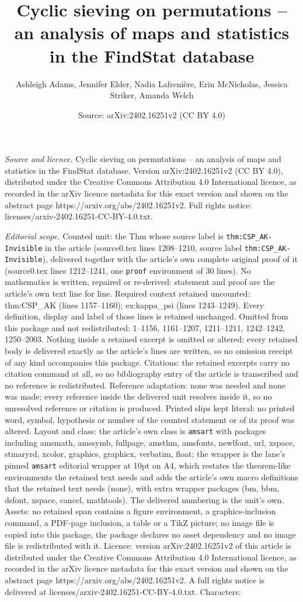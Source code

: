 \documentclass[10pt,a4paper]{amsart}
\title[Cyclic sieving on permutations -- an analysis of maps and st]{Cyclic sieving on permutations -- an analysis of maps and statistics in the FindStat database}
\author{Ashleigh Adams, Jennifer Elder, Nadia Lafreni\`ere, Erin McNicholas, Jessica Striker, Amanda Welch}
\date{Source: arXiv:2402.16251v2 (CC BY 4.0)}
\begin{document}
\maketitle

\noindent\emph{Source and licence.} Cyclic sieving on permutations -- an analysis of maps and statistics in the FindStat database. Version arXiv:2402.16251v2 (CC BY 4.0), distributed under the Creative Commons Attribution 4.0 International licence, as recorded in the arXiv licence metadata for this exact version and shown on the abstract page https://arxiv.org/abs/2402.16251v2. Full rights notice: licenses/arxiv-2402.16251-CC-BY-4.0.txt.\par\smallskip

\noindent\textit{Editorial scope.} Counted unit: the Thm whose source label is \texttt{thm:CSP\_AK-Invisible} in the article (source0.tex lines 1208--1210, source label \texttt{thm:CSP\_AK-Invisible}), delivered together with the article's own complete original proof of it (source0.tex lines 1212--1241, one \texttt{proof} environment of 30 lines). No mathematics is written, repaired or re-derived: statement and proof are the article's own text line for line. Required context retained uncounted: thm:CSP\_AK (lines 1157--1160); ex:kappa\_psi (lines 1243--1249). Every definition, display and label of those lines is retained unchanged. Omitted from this package and not redistributed: 1--1156, 1161--1207, 1211--1211, 1242--1242, 1250--2003. Nothing inside a retained excerpt is omitted or altered: every retained body is delivered exactly as the article's lines are written, so no omission receipt of any kind accompanies this package. Citations: the retained excerpts carry no citation command at all, so no bibliography entry of the article is transcribed and no reference is redistributed. Reference adaptation: none was needed and none was made; every reference inside the delivered unit resolves inside it, so no unresolved reference or citation is produced. Printed slips kept literal: no printed word, symbol, hypothesis or number of the counted statement or of its proof was altered. Layout and class: the article's own class is \texttt{amsart} with packages including amsmath, amssymb, fullpage, amsthm, amsfonts, newlfont, url, xspace, stmaryrd, xcolor, graphics, graphicx, verbatim, float; the wrapper is the lane's pinned \texttt{amsart} editorial wrapper at 10pt on A4, which restates the theorem-like environments the retained text needs and adds the article's own macro definitions that the retained text needs (none), with extra wrapper packages (bm, bbm, dsfont, xspace, cancel, mathtools). The delivered numbering is the unit's own. Assets: no retained span contains a figure environment, a graphics-inclusion command, a PDF-page inclusion, a table or a TikZ picture; no image file is copied into this package, the package declares no asset dependency and no image file is redistributed with it. Licence: version arXiv:2402.16251v2 of this article is distributed under the Creative Commons Attribution 4.0 International licence, as recorded in the arXiv licence metadata for this exact version and shown on the abstract page https://arxiv.org/abs/2402.16251v2. A full rights notice is delivered at licenses/arxiv-2402.16251-CC-BY-4.0.txt. Characters: 
\end{document}
